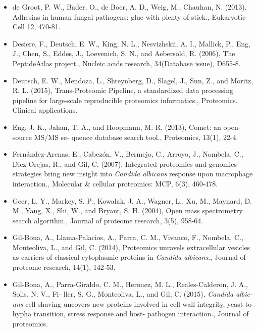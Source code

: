 \begin{otherlanguage}{british}
\begin{itemize}[leftmargin=*]
\item[]{
de Groot, P. W., Bader, O., de Boer, A. D., Weig, M., Chauhan, N. (2013),
Adhesins in human fungal pathogens: glue with plenty of stick., 
Eukaryotic Cell 12, 470-81.
}

\item[]{%
Desiere, F., Deutsch, E. W., King, N. L., Nesvizhskii, A. I., Mallick, P., Eng, J., Chen, S., Eddes,
J., Loevenich, S. N., and Aebersold, R. (2006), The PeptideAtlas project., Nucleic acids
research, 34(Database issue), D655-8.
}

\item[]{%
Deutsch, E. W., Mendoza, L., Shteynberg, D., Slagel, J., Sun, Z., and Moritz, R. L. (2015),
Trans-Proteomic Pipeline, a standardized data processing pipeline for large-scale 
reproducible proteomics informatics., Proteomics. Clinical applications.
}

\item[]{%
Eng, J. K., Jahan, T. A., and Hoopmann, M. R. (2013), Comet: an open-source MS/MS se-
quence database search tool., Proteomics, 13(1), 22-4.
}

\item[]{%
Fern\'andez-Arenas, E., Cabez\'on, V., Bermejo, C., Arroyo, J., Nombela, C., Diez-Orejas, R.,
and Gil, C. (2007), Integrated proteomics and genomics strategies bring new insight into
\textit{Candida albicans} response upon macrophage interaction., 
Molecular \& cellular proteomics: MCP, 6(3), 460-478.
}

\item[]{%
Geer, L. Y., Markey, S. P., Kowalak, J. A., Wagner, L., Xu, M., Maynard, D. M., Yang, X., Shi, W.,
and Bryant, S. H. (2004), Open mass spectrometry search algorithm., Journal of proteome
research, 3(5), 958-64.
}

\item[]{%
Gil-Bona, A., Llama-Palacios, A., Parra, C. M., Vivanco, F., Nombela, C., Monteoliva, L., and
Gil, C. (2014), Proteomics unravels extracellular vesicles as carriers of classical cytoplasmic
proteins in \textit{Candida albicans}., Journal of proteome research, 14(1), 142-53.
}

\item[]{%
Gil-Bona, A., Parra-Giraldo, C. M., Hernaez, M. L., Reales-Calderon, J. A., Solis, N. V., Fi-
ller, S. G., Monteoliva, L., and Gil, C. (2015), \textit{Candida albicans} cell shaving uncovers new
proteins involved in cell wall integrity, yeast to hypha transition, stress response and host-
pathogen interaction., Journal of proteomics.
}



\end{itemize}
\end{otherlanguage}
